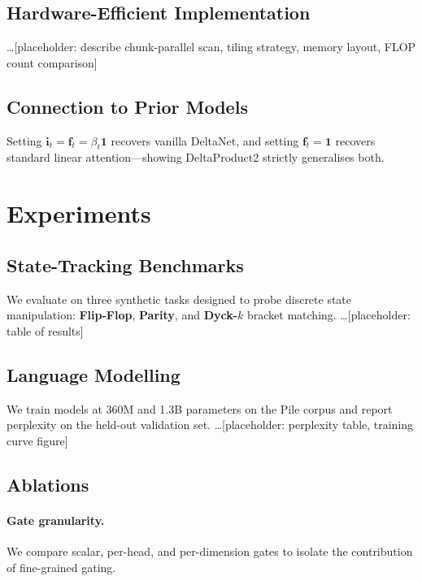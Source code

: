 \documentclass[11pt]{article}
\begin{document}
\subsection{Hardware-Efficient Implementation}

\ldots [placeholder: describe chunk-parallel scan, tiling strategy,
memory layout, FLOP count comparison]

\subsection{Connection to Prior Models}

Setting $\mathbf{i}_t = \mathbf{f}_t = \beta_t \mathbf{1}$ recovers
vanilla DeltaNet, and setting $\mathbf{f}_t = \mathbf{1}$ recovers
standard linear attention---showing DeltaProduct2 strictly generalises
both.

\section{Experiments}
\label{sec:experiments}

\subsection{State-Tracking Benchmarks}

We evaluate on three synthetic tasks designed to probe discrete state
manipulation: \textbf{Flip-Flop}, \textbf{Parity}, and
\textbf{Dyck-$k$} bracket matching.
\ldots [placeholder: table of results]

\subsection{Language Modelling}

We train models at 360M and 1.3B parameters on the Pile corpus and
report perplexity on the held-out validation set.
\ldots [placeholder: perplexity table, training curve figure]

\subsection{Ablations}

\paragraph{Gate granularity.}
We compare scalar, per-head, and per-dimension gates to isolate the
contribution of fine-grained gating.
\end{document}
